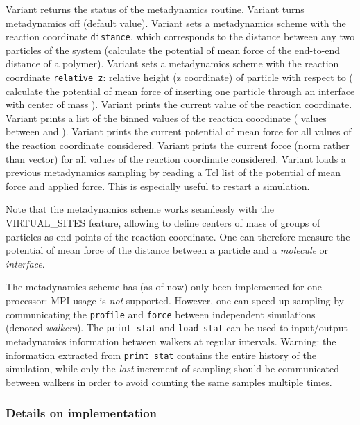 Variant  returns the status of the metadynamics
routine. Variant  turns metadynamics off (default
value). Variant  sets a metadynamics scheme with the
reaction coordinate \texttt{distance}, which corresponds to the
distance between any two particles of the system (\eg calculate the
potential of mean force of the end-to-end distance of a
polymer). Variant  sets a metadynamics scheme with the
reaction coordinate \texttt{relative_z}: relative height (\ie z
coordinate) of particle  with respect to  (\eg
calculate the potential of mean force of inserting one particle
 through an interface with center of mass
). Variant  prints the current value of the
reaction coordinate. Variant  prints a list of the binned
values of the reaction coordinate (\eg {} values
between  and ). Variant
 prints the current potential of mean force for all values
of the reaction coordinate considered. Variant  prints the
current force (norm rather than vector) for all values of the reaction
coordinate considered. Variant  loads a previous
metadynamics sampling by reading a Tcl list of the potential of mean
force and applied force. This is especially useful to restart a
simulation.

Note that the metadynamics scheme works seamlessly with the
VIRTUAL_SITES feature, allowing to define centers of mass of groups of
particles as end points of the reaction coordinate. One can therefore
measure the potential of mean force of the distance between a particle
and a \emph{molecule} or \emph{interface}.

The metadynamics scheme has (as of now) only been implemented for one
processor: MPI usage is \emph{not} supported. However, one can speed up
sampling by communicating the \texttt{profile} and \texttt{force}
between independent simulations (denoted \emph{walkers}). The
\texttt{print_stat} and \texttt{load_stat} can be used to input/output
metadynamics information between walkers at regular
intervals. Warning: the information extracted from \texttt{print_stat}
contains the entire history of the simulation, while only the
\emph{last} increment of sampling should be communicated between
walkers in order to avoid counting the same samples multiple times.

\subsubsection{Details on implementation}

